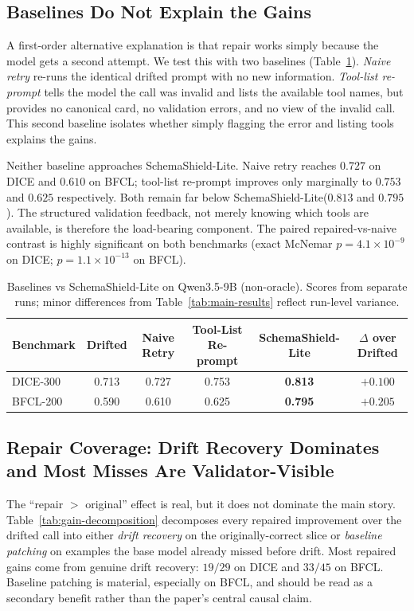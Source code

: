 \documentclass{svproc}
\newcommand{\method}{SchemaShield-Lite\xspace}
\begin{document}
\subsection{Baselines Do Not Explain the Gains}
\label{sec:naive-retry}
A first-order alternative explanation is that repair works simply because the model
gets a second attempt. We test this with two baselines
(Table~\ref{tab:naive-retry}). \emph{Naive retry} re-runs the identical drifted
prompt with no new information. \emph{Tool-list re-prompt} tells the model the
call was invalid and lists the available tool names, but provides no canonical
card, no validation errors, and no view of the invalid call. This second baseline
isolates whether simply flagging the error and listing tools explains the gains.

Neither baseline approaches \method. Naive retry reaches $0.727$ on DICE and
$0.610$ on BFCL; tool-list re-prompt improves only marginally to $0.753$ and
$0.625$ respectively. Both remain far below \method ($0.813$ and $0.795$).
The structured validation feedback, not merely knowing which tools are
available, is therefore the load-bearing component. The paired
repaired-vs-naive contrast is highly significant on both benchmarks
(exact McNemar $p=4.1\times 10^{-9}$ on DICE; $p=1.1\times 10^{-13}$ on BFCL).

\begin{table}[t]
\caption{Baselines vs \method on Qwen3.5-9B (non-oracle). Scores from separate
runs; minor differences from Table~\ref{tab:main-results} reflect run-level variance.}
\label{tab:naive-retry}
\centering
\scriptsize
\setlength{\tabcolsep}{3pt}
\begin{tabular}{lccccc}
\toprule
Benchmark & Drifted & Naive Retry & Tool-List Re-prompt & \method & $\Delta$ over Drifted \\
\midrule
DICE-300   & 0.713 & 0.727 & 0.753 & \textbf{0.813} & $+0.100$ \\
BFCL-200   & 0.590 & 0.610 & 0.625 & \textbf{0.795} & $+0.205$ \\
\bottomrule
\end{tabular}
\end{table}

\subsection{Repair Coverage: Drift Recovery Dominates and Most Misses Are Validator-Visible}
\label{sec:repair-coverage}
The ``repair $>$ original'' effect is real, but it does not dominate the main
story. Table~\ref{tab:gain-decomposition} decomposes every repaired improvement over
the drifted call into either \emph{drift recovery} on the originally-correct slice
or \emph{baseline patching} on examples the base model already missed before drift.
Most repaired gains come from genuine drift recovery: $19/29$ on DICE and
$33/45$ on BFCL. Baseline patching is material, especially on BFCL, and should be
read as a secondary benefit rather than the paper's central causal claim.
\end{document}

